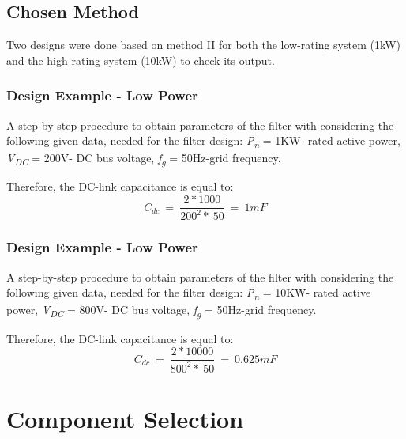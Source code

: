 \documentclass[12pt,a4paper]{book}
\begin{document}
\subsection{Chosen Method}
Two designs were done based on method II for both the low-rating system (1kW) and the high-rating system (10kW) to check its output.

\subsubsection{Design Example - Low Power}
A step-by-step procedure to obtain parameters of the filter with considering the following given data, needed for the filter design: \emph{P\textsubscript{n}} = 1KW- rated active power, \emph{V\textsubscript{DC}} = 200V- DC bus voltage, \emph{f\textsubscript{g}} = 50Hz-grid frequency.

Therefore, the DC-link capacitance is equal to:
\[C_{dc}\  = \ \frac{2*1000}{200^{2}*\ 50}\  = \ 1mF\]

\subsubsection{Design Example - Low Power}
A step-by-step procedure to obtain parameters of the filter with considering the following given data, needed for the filter design: \emph{P\textsubscript{n}} = 10KW- rated active power, \emph{V\textsubscript{DC}} = 800V- DC bus voltage, \emph{f\textsubscript{g}} = 50Hz-grid frequency.

Therefore, the DC-link capacitance is equal to:
\[C_{dc}\  = \ \frac{2*10000}{800^{2}*\ 50}\  = \ 0.625mF\]

\section{Component Selection}
\end{document}
